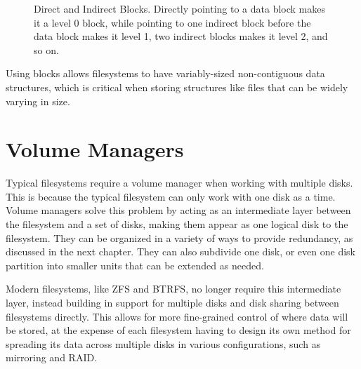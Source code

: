 \begin{figure}[H]
    \centering
    \resizebox{0.5\linewidth}{!}{}
    \captionsetup{width=0.5\linewidth}
    \caption{Direct and Indirect Blocks. Directly pointing to a data block makes it a level 0 block,
    while pointing to one indirect block before the data block makes it level 1, two indirect blocks
    makes it level 2, and so on.}

    \label{fig:directindirectblocks}
\end{figure}

Using blocks allows filesystems to have variably-sized non-contiguous data structures, which is critical when storing structures
like files that can be widely varying in size.

\section{Volume Managers} 
\label{chapter:volumemanagers}
Typical filesystems require a volume manager when working with multiple disks.
This is because the typical filesystem can only work with one disk as a time.
Volume managers solve this problem by acting as an intermediate layer between the filesystem and a set of disks,
making them appear as one logical disk to the filesystem.
They can be organized in a variety of ways to provide redundancy, as discussed in the next chapter.
They can also subdivide one disk, or even one disk partition into smaller units that can be extended as needed.

Modern filesystems, like ZFS and BTRFS, no longer require this intermediate layer, instead building in support for multiple disks
and disk sharing between filesystems directly.
This allows for more fine-grained control of where data will be stored, at the expense of each filesystem having to design its own method
for spreading its data across multiple disks in various configurations, such as mirroring and RAID.

